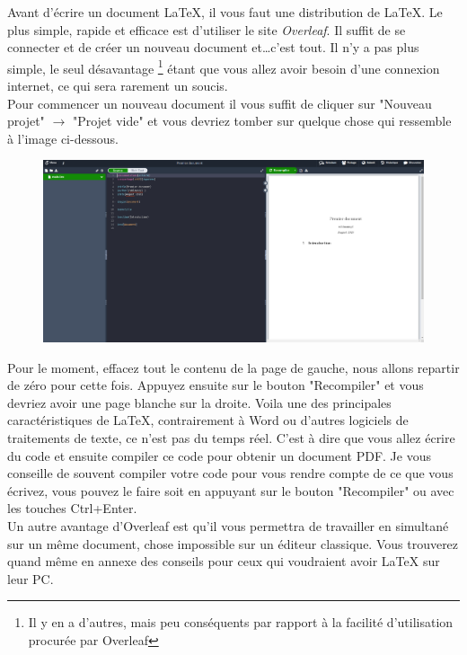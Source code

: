 \documentclass[11pt]{article}				%
\begin{document}
Avant d'écrire un document LaTeX, il vous faut une distribution de LaTeX. Le plus simple, rapide et efficace est d'utiliser le site \textit{Overleaf}. Il suffit de se connecter et de créer un nouveau document et\dots c'est tout. Il n'y a pas plus simple, le seul désavantage \footnote{Il y en a d'autres, mais peu conséquents par rapport à la facilité d'utilisation procurée par Overleaf} étant que vous allez avoir besoin d'une connexion internet, ce qui sera rarement un soucis.\\
Pour commencer un nouveau document il vous suffit de cliquer sur "Nouveau projet" $\longrightarrow$ "Projet vide" et vous devriez tomber sur quelque chose qui ressemble à l'image ci-dessous.
\begin{figure}[h!]
	\centering
	\includegraphics[scale=0.25]{ressources/overleaf_projet_vide.png}
\end{figure}	

Pour le moment, effacez tout le contenu de la page de gauche, nous  allons repartir de zéro pour cette fois. Appuyez ensuite sur le bouton "Recompiler" et vous devriez avoir une page blanche sur la droite.
Voila une des principales caractéristiques de LaTeX, contrairement à Word ou d'autres logiciels de traitements de texte, ce n'est pas du temps réel. C'est à dire que vous allez écrire du code et ensuite compiler ce code pour obtenir un document PDF. Je vous conseille de souvent compiler votre code pour vous rendre compte de ce que vous écrivez, vous pouvez le faire soit en appuyant sur le bouton "Recompiler" ou avec les touches Ctrl+Enter.\\



Un autre avantage d'Overleaf est qu'il vous permettra de travailler en simultané sur un même document, chose impossible sur un éditeur classique.
Vous trouverez quand même en annexe des conseils pour ceux qui voudraient avoir LaTeX sur leur PC.
\end{document}
